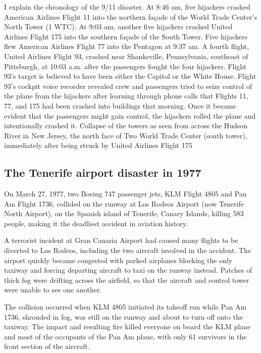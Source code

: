 \documentclass[a4paper,10pt]{article}
\begin{document}
I explain the chronology of the 9/11 disaster.  At 8:46 am, five hijackers crashed American Airlines Flight 11 into the northern façade of the World Trade Center's North Tower (1 WTC). At 9:03 am, another five hijackers crashed United Airlines Flight 175 into the southern façade of the South Tower. Five hijackers flew American Airlines Flight 77 into the Pentagon at 9:37 am. A fourth flight, United Airlines Flight 93, crashed near Shanksville, Pennsylvania, southeast of Pittsburgh, at 10:03 a.m. after the passengers fought the four hijackers. Flight 93's target is believed to have been either the Capitol or the White House. Flight 93's cockpit voice recorder revealed crew and passengers tried to seize control of the plane from the hijackers after learning through phone calls that Flights 11, 77, and 175 had been crashed into buildings that morning. Once it became evident that the passengers might gain control, the hijackers rolled the plane and intentionally crashed it.
Collapse of the towers as seen from across the Hudson River in New Jersey, the north face of Two World Trade Center (south tower), immediately after being struck by United Airlines Flight 175 \par

\subsection{The Tenerife airport disaster in 1977}
On March 27, 1977, two Boeing 747 passenger jets, KLM Flight 4805 and Pan Am Flight 1736, collided on the runway at Los Rodeos Airport (now Tenerife North Airport), on the Spanish island of Tenerife, Canary Islands, killing 583 people, making it the deadliest accident in aviation history.\par

A terrorist incident at Gran Canaria Airport had caused many flights to be diverted to Los Rodeos, including the two aircraft involved in the accident. The airport quickly became congested with parked airplanes blocking the only taxiway and forcing departing aircraft to taxi on the runway instead. Patches of thick fog were drifting across the airfield, so that the aircraft and control tower were unable to see one another.\par

The collision occurred when KLM 4805 initiated its takeoff run while Pan Am 1736, shrouded in fog, was still on the runway and about to turn off onto the taxiway. The impact and resulting fire killed everyone on board the KLM plane and most of the occupants of the Pan Am plane, with only 61 survivors in the front section of the aircraft.\par
\end{document}

